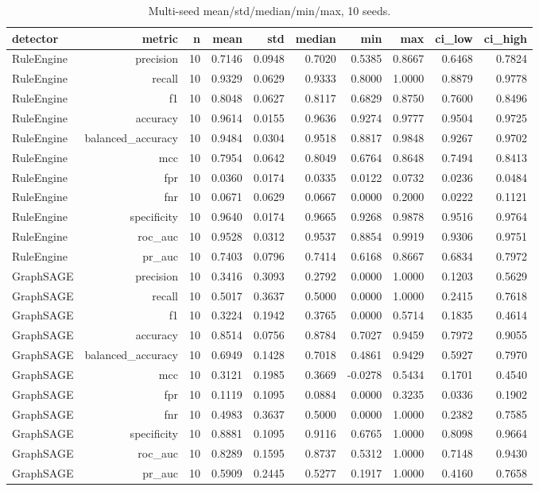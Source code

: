 \begin{table}[htbp]
\centering
\caption{Multi-seed mean/std/median/min/max, 10 seeds.}
\label{tab:multiseed}
\begin{tabular}{lrrrrrrrrr}
\hline
detector & metric & n & mean & std & median & min & max & ci_low & ci_high \\
\hline
RuleEngine & precision & 10 & 0.7146 & 0.0948 & 0.7020 & 0.5385 & 0.8667 & 0.6468 & 0.7824 \\
RuleEngine & recall & 10 & 0.9329 & 0.0629 & 0.9333 & 0.8000 & 1.0000 & 0.8879 & 0.9778 \\
RuleEngine & f1 & 10 & 0.8048 & 0.0627 & 0.8117 & 0.6829 & 0.8750 & 0.7600 & 0.8496 \\
RuleEngine & accuracy & 10 & 0.9614 & 0.0155 & 0.9636 & 0.9274 & 0.9777 & 0.9504 & 0.9725 \\
RuleEngine & balanced_accuracy & 10 & 0.9484 & 0.0304 & 0.9518 & 0.8817 & 0.9848 & 0.9267 & 0.9702 \\
RuleEngine & mcc & 10 & 0.7954 & 0.0642 & 0.8049 & 0.6764 & 0.8648 & 0.7494 & 0.8413 \\
RuleEngine & fpr & 10 & 0.0360 & 0.0174 & 0.0335 & 0.0122 & 0.0732 & 0.0236 & 0.0484 \\
RuleEngine & fnr & 10 & 0.0671 & 0.0629 & 0.0667 & 0.0000 & 0.2000 & 0.0222 & 0.1121 \\
RuleEngine & specificity & 10 & 0.9640 & 0.0174 & 0.9665 & 0.9268 & 0.9878 & 0.9516 & 0.9764 \\
RuleEngine & roc_auc & 10 & 0.9528 & 0.0312 & 0.9537 & 0.8854 & 0.9919 & 0.9306 & 0.9751 \\
RuleEngine & pr_auc & 10 & 0.7403 & 0.0796 & 0.7414 & 0.6168 & 0.8667 & 0.6834 & 0.7972 \\
GraphSAGE & precision & 10 & 0.3416 & 0.3093 & 0.2792 & 0.0000 & 1.0000 & 0.1203 & 0.5629 \\
GraphSAGE & recall & 10 & 0.5017 & 0.3637 & 0.5000 & 0.0000 & 1.0000 & 0.2415 & 0.7618 \\
GraphSAGE & f1 & 10 & 0.3224 & 0.1942 & 0.3765 & 0.0000 & 0.5714 & 0.1835 & 0.4614 \\
GraphSAGE & accuracy & 10 & 0.8514 & 0.0756 & 0.8784 & 0.7027 & 0.9459 & 0.7972 & 0.9055 \\
GraphSAGE & balanced_accuracy & 10 & 0.6949 & 0.1428 & 0.7018 & 0.4861 & 0.9429 & 0.5927 & 0.7970 \\
GraphSAGE & mcc & 10 & 0.3121 & 0.1985 & 0.3669 & -0.0278 & 0.5434 & 0.1701 & 0.4540 \\
GraphSAGE & fpr & 10 & 0.1119 & 0.1095 & 0.0884 & 0.0000 & 0.3235 & 0.0336 & 0.1902 \\
GraphSAGE & fnr & 10 & 0.4983 & 0.3637 & 0.5000 & 0.0000 & 1.0000 & 0.2382 & 0.7585 \\
GraphSAGE & specificity & 10 & 0.8881 & 0.1095 & 0.9116 & 0.6765 & 1.0000 & 0.8098 & 0.9664 \\
GraphSAGE & roc_auc & 10 & 0.8289 & 0.1595 & 0.8737 & 0.5312 & 1.0000 & 0.7148 & 0.9430 \\
GraphSAGE & pr_auc & 10 & 0.5909 & 0.2445 & 0.5277 & 0.1917 & 1.0000 & 0.4160 & 0.7658 \\
\hline
\end{tabular}
\end{table}
